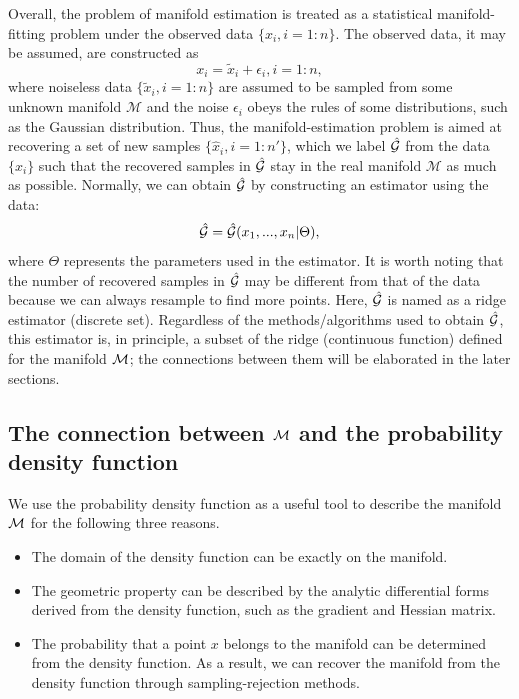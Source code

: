 \documentclass[aos,preprint]{imsart}
\theoremstyle{remark}
\begin{document}
Overall, the problem of manifold estimation is treated as a statistical manifold-fitting problem under the observed data $\{x_i, i=1:n\}$. The observed data, it may be assumed, are constructed as 
\[
x_i=\tilde{x}_i+\epsilon_i, i=1:n,
\] 
where noiseless data $\{\tilde{x}_i, i= 1:n\}$ are assumed to be sampled from some unknown manifold $\mathcal M$ and the noise $\epsilon_i$ obeys the rules of some distributions, such as the Gaussian distribution.  %
Thus, the manifold-estimation problem is aimed at recovering a set of new samples $\{\hat{x}_i, i= 1:n'\}$, which we label $\hat{\cal G}$ from the data $\{x_i\}$ such that the recovered samples in $\hat{\cal G}$ stay in the real manifold $\mathcal M$ as much as possible. Normally, we can obtain $\hat{\cal G}$ by constructing an estimator using the data:
\begin{equation}\label{Estimator}
\hat{\cal G} = \hat{\cal G}(x_1,...,x_n | \Theta),
\end{equation}
where $\Theta$ represents the parameters used in the estimator. It is worth noting that the number of recovered samples in $\hat{\cal G}$ may be different from that of the data because we can always resample to find more points. Here, $\hat{\cal G}$ is named as a ridge estimator (discrete set). Regardless of the methods/algorithms used to obtain $\hat{\cal G}$, this estimator is, in principle, a subset of the ridge (continuous function) defined for the manifold $\cal{M}$; the connections between them will be elaborated in the later sections.



\subsection{The connection between $\cal M$ and the probability density function}
We use the probability density function as a useful tool to describe the manifold $\cal M$ for the following three reasons.
\begin{itemize}
\item The domain of the density function can be exactly on the manifold. 
\item The geometric property can be described by the analytic differential forms derived from the density function, such as the gradient and Hessian matrix.
\item The probability that a point $x$ belongs to the manifold can be determined from the density function. As a result, we can recover the manifold from the density function through sampling-rejection methods.
\end{itemize}
\end{document}
